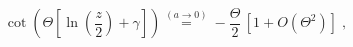 \begin{equation}
 \cot 
\left(
\Theta
\left[
\ln \left( \frac{ z }{2} \right) 
+ \gamma
\right]
\right)
\stackrel{(a \rightarrow 0)}{=}
-
\frac{\Theta}{2} \,
\left[ 1 + O (\Theta^{2}) \right]
\;   ,
\label{eq:eigenvalue_2D_ISP_circular_well_limit_a=0_approx}
\end{equation}

